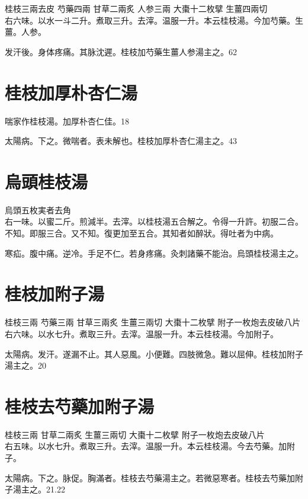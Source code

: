 桂枝{\scriptsize 三兩去皮} 芍藥{\scriptsize 四兩} 甘草{\scriptsize 二兩炙} 人参{\scriptsize 三兩} 大棗{\scriptsize 十二枚擘} 生薑{\scriptsize 四兩切}\\
右六味。以水一斗二升。煮取三升。去滓。温服一升。本云桂枝湯。今加芍藥。生薑。人参。

发汗後。身体疼痛。其脉沈遲。桂枝加芍藥生薑人参湯主之。62

\section{桂枝加厚朴杏仁湯}

喘家作桂枝湯。加厚朴杏仁佳。18

太陽病。下之。微喘者。表未解也。桂枝{\khaaitp 加厚朴杏仁}湯主之。43

\section{烏頭桂枝湯}

烏頭{\scriptsize 五枚実者去角}\\
右一味。以蜜二斤。煎減半。去滓。以桂枝湯五合解之。令得一升許。初服二合。不知。即服三合。又不知。復更加至五合。其知者如醉狀。得吐者为中病。

寒疝。腹中痛。逆冷。手足不仁。若身疼痛。灸刺諸藥不能治。烏頭桂枝湯主之。

\section{桂枝加附子湯}

桂枝{\scriptsize 三兩} 芍藥{\scriptsize 三兩} 甘草{\scriptsize 三兩炙} 生薑{\scriptsize 三兩切} 大棗{\scriptsize 十二枚擘} 附子{\scriptsize 一枚炮去皮破八片}\\
右六味。以水七升。煮取三升。去滓。温服一升。本云桂枝湯。今加附子。

太陽病。发汗。遂漏不止。其人惡風。小便難。四肢微急。難以屈伸。桂枝加附子湯主之。20

\section{桂枝去芍藥加附子湯}

桂枝{\scriptsize 三兩} 甘草{\scriptsize 二兩炙} 生薑{\scriptsize 三兩切} 大棗{\scriptsize 十二枚擘} 附子{\scriptsize 一枚炮去皮破八片}\\
右五味。以水七升。煮取三升。去滓。温服一升。本云桂枝湯。今去芍藥。加附子。

太陽病。下之。脉促。胸滿者。桂枝去芍藥湯主之。若微{\khaaitp 惡}寒者。桂枝去芍藥加附子湯主之。21.22

